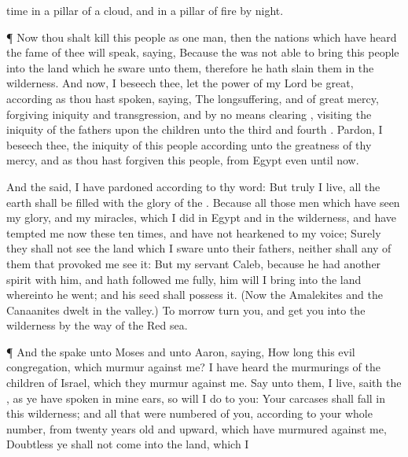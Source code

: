{time in a
pillar of a
cloud, and in a
pillar of
fire by
night.
\par }{\PP {}¶ Now
{} thou shalt
kill
{} this
people as
one
man, then the
nations which have
heard the
fame of thee will
speak,
saying,
Because the
{} was
not
able to
bring this
people into the
land which he
sware unto them, therefore he hath
slain them in the
wilderness.
And now, I beseech thee, let the
power of my
Lord be
great,
according as thou hast
spoken,
saying,
The
{}
{}
longsuffering, and of
great
mercy,
forgiving
iniquity and
transgression, and by no
means
clearing
{},
visiting the
iniquity of the
fathers upon the
children unto the
third and
fourth
{}.
Pardon, I beseech thee, the
iniquity of this
people according unto the
greatness of thy
mercy, and as thou hast
forgiven this
people, from
Egypt even until
now.
\par }{\PP {}And the
{}
said, I have
pardoned according to thy
word:
But
{}
truly
{} I
live, all the
earth shall be
filled with the
glory of the
{}.
Because all those
men which have
seen my
glory, and my
miracles, which I
did in
Egypt and in the
wilderness, and have
tempted me now these
ten
times, and have not
hearkened to my
voice;
Surely they shall
not
see the
land which I
sware unto their
fathers, neither shall any of them that
provoked me
see it:
But my
servant
Caleb,
because he had
another
spirit with him, and hath
followed me
fully, him will I
bring into the
land whereinto he
went; and his
seed shall
possess it.
(Now the
Amalekites and the
Canaanites
dwelt in the
valley.) To
morrow
turn you, and
get you into the
wilderness by the
way of the
Red
sea.
\par }{\PP {}¶ And the
{}
spake unto
Moses and unto
Aaron,
saying,
How long
{} this
evil
congregation, which
murmur against me? I have
heard the
murmurings of the
children of
Israel, which they
murmur against me.
Say unto them,
{} I
live,
saith the
{}, as ye have
spoken in mine
ears, so will I
do to you:
Your
carcases shall
fall in this
wilderness; and all that were
numbered of you, according to your whole
number, from
twenty
years
old and
upward, which have
murmured against me,
Doubtless ye shall
not
come into the
land,
{} which I
}
